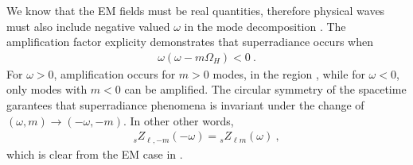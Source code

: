 We know that the EM fields must be real quantities, therefore physical waves must also include negative valued $\omega$ in the mode decomposition .
The amplification factor explicity demonstrates that superradiance occurs when
\begin{align}
    \label{eq3:superradiance}
    \omega(\omega-m\Omega_H)<0 ~.
\end{align}
For $\omega>0$, amplification occurs for $m>0$ modes, in the region , while for $\omega<0$, only modes with $m<0$ can be amplified.
The circular symmetry of the spacetime garantees that superradiance phenomena is invariant under the change of $(\omega,m)\to(-\omega,-m)$.
In other other words,
\begin{align}
    {}_{s}Z_{\ell,-m}(-\omega) = {}_{s}Z_{\ell m}(\omega) ~,
\end{align}
which is clear from the EM case in .


\cleardoublepage